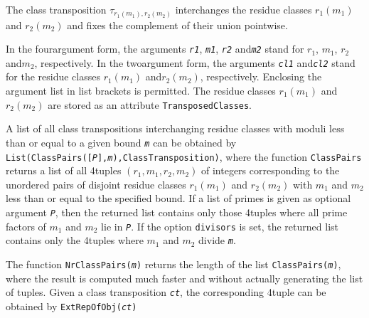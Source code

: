 \documentclass[a4paper,11pt]{report}
\begin{document}
{{{ The class transposition $\tau_{r_1(m_1),r_2(m_2)}$ interchanges the residue classes $r_1(m_1)$ and $r_2(m_2)$ and fixes the complement of their union pointwise. 

  In the four\texttt{}argument form, the arguments \mbox{\texttt{\mdseries\slshape r1}}, \mbox{\texttt{\mdseries\slshape m1}}, \mbox{\texttt{\mdseries\slshape r2}} and{\nobreakspace}\mbox{\texttt{\mdseries\slshape m2}} stand for $r_1$, $m_1$, $r_2$ and{\nobreakspace}$m_2$, respectively. In the two\texttt{}argument form, the arguments \mbox{\texttt{\mdseries\slshape cl1}} and{\nobreakspace}\mbox{\texttt{\mdseries\slshape cl2}} stand for the residue classes $r_1(m_1)$ and{\nobreakspace}$r_2(m_2)$, respectively. Enclosing the argument list in list brackets is permitted. The
residue classes $r_1(m_1)$ and $r_2(m_2)$ are stored as an attribute \texttt{TransposedClasses}. 

  A list of all class transpositions interchanging residue classes with moduli
less than or equal to a given bound \mbox{\texttt{\mdseries\slshape m}} can be obtained by \texttt{List(ClassPairs([\mbox{\texttt{\mdseries\slshape P}}],\mbox{\texttt{\mdseries\slshape m}}),ClassTransposition)}, where the function \texttt{ClassPairs} returns a list of all 4\texttt{}tuples $(r_1,m_1,r_2,m_2)$ of integers corresponding to the unordered pairs of disjoint residue classes $r_1(m_1)$ and $r_2(m_2)$ with $m_1$ and $m_2$ less than or equal to the specified bound. If a list of primes is given as
optional argument \mbox{\texttt{\mdseries\slshape P}}, then the returned list contains only those 4\texttt{}tuples where
all prime factors of $m_1$ and $m_2$ lie in \mbox{\texttt{\mdseries\slshape P}}. If the option \texttt{divisors} is set, the returned list contains only the 4\texttt{}tuples where $m_1$ and $m_2$ divide \mbox{\texttt{\mdseries\slshape m}}. 

   The function \texttt{NrClassPairs(\mbox{\texttt{\mdseries\slshape m}})} returns the length of the list \texttt{ClassPairs(\mbox{\texttt{\mdseries\slshape m}})}, where the result is computed much faster and without actually generating the
list of tuples. Given a class transposition \mbox{\texttt{\mdseries\slshape ct}}, the corresponding 4\texttt{}tuple can be obtained by \texttt{ExtRepOfObj(\mbox{\texttt{\mdseries\slshape ct}})} 

}}}
\end{document}
